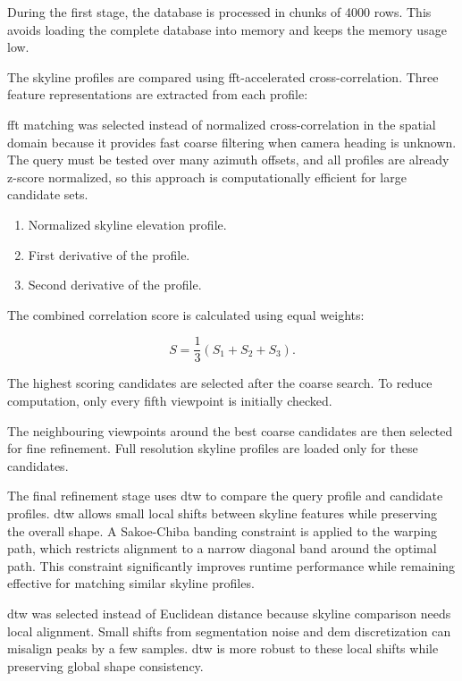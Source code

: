 During the first stage, the database is processed in chunks of 4000 rows. This avoids loading the complete database into memory and keeps the memory usage low.

The skyline profiles are compared using \gls{fft}-accelerated cross-correlation. Three feature representations are extracted from each profile:

\gls{fft} matching was selected instead of normalized cross-correlation in the spatial domain because it provides fast coarse filtering when camera heading is unknown. The query must be tested over many azimuth offsets, and all profiles are already z-score normalized, so this approach is computationally efficient for large candidate sets.

\begin{enumerate}
    \item Normalized skyline elevation profile.
    \item First derivative of the profile.
    \item Second derivative of the profile.
\end{enumerate}

The combined correlation score is calculated using equal weights:

\begin{equation}
S = \frac{1}{3}\left(S_1 + S_2 + S_3\right).
\end{equation}

The highest scoring candidates are selected after the coarse search. To reduce computation, only every fifth viewpoint is initially checked.

The neighbouring viewpoints around the best coarse candidates are then selected for fine refinement. Full resolution skyline profiles are loaded only for these candidates.

The final refinement stage uses \gls{dtw} to compare the query profile and candidate profiles. \gls{dtw} allows small local shifts between skyline features while preserving the overall shape. A Sakoe-Chiba banding constraint is applied to the warping path, which restricts alignment to a narrow diagonal band around the optimal path. This constraint significantly improves runtime performance while remaining effective for matching similar skyline profiles.

\gls{dtw} was selected instead of Euclidean distance because skyline comparison needs local alignment. Small shifts from segmentation noise and \gls{dem} discretization can misalign peaks by a few samples. \gls{dtw} is more robust to these local shifts while preserving global shape consistency.

